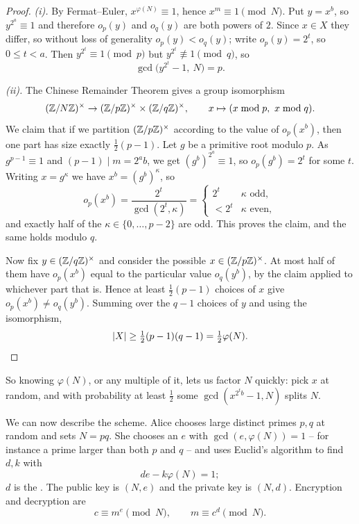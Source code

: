 \documentclass[a4paper]{scrartcl}
\begin{document}
\begin{proof}
	\emph{(i).} By Fermat--Euler, $x^{\varphi(N)}\equiv1$, hence $x^m\equiv1\pmod N$. Put $y = x^b$, so $y^{2^a}\equiv1$ and therefore $o_p(y)$ and $o_q(y)$ are both powers of $2$. Since $x \in X$ they differ, so without loss of generality $o_p(y)<o_q(y)$; write $o_p(y)=2^t$, so $0 \le t<a$. Then $y^{2^t}\equiv1\pmod p$ but $y^{2^t}\not\equiv1\pmod q$, so
	$$\gcd\bigl(y^{2^t}-1,\ N\bigr) = p.$$

	\emph{(ii).} The Chinese Remainder Theorem gives a group isomorphism
	$$(\Z/N\Z)^\times \to (\Z/p\Z)^\times\times(\Z/q\Z)^\times, \qquad x \mapsto (x \bmod p,\ x\bmod q).$$
	We claim that if we partition $(\mathbb{Z}/p\mathbb{Z})^\times$ according to the value of $o_p(x^b)$, then one part has size exactly $\tfrac12(p-1)$. Let $g$ be a primitive root modulo $p$. As $g^{p-1}\equiv1$ and $(p-1)\mid m = 2^ab$, we get $(g^b)^{2^a}\equiv1$, so $o_p(g^b) = 2^t$ for some $t$. Writing $x = g^\kappa$ we have $x^b = (g^b)^\kappa$, so
	$$o_p(x^b) = \frac{2^t}{\gcd(2^t,\kappa)} = \begin{cases} 2^t & \kappa \text{ odd},\\ <2^t & \kappa \text{ even},\end{cases}$$
	and exactly half of the $\kappa \in\{0,\dots,p-2\}$ are odd. This proves the claim, and the same holds modulo $q$.

	Now fix $y \in (\mathbb{Z}/q\mathbb{Z})^\times$ and consider the possible $x \in (\mathbb{Z}/p\mathbb{Z})^\times$. At most half of them have $o_p(x^b)$ equal to the particular value $o_q(y^b)$, by the claim applied to whichever part that is. Hence at least $\tfrac12(p-1)$ choices of $x$ give $o_p(x^b)\ne o_q(y^b)$. Summing over the $q-1$ choices of $y$ and using the isomorphism,
	$$\lvert X\rvert\ge\tfrac12(p-1)(q-1) = \tfrac12\varphi(N). \qedhere$$
\end{proof}

So knowing $\varphi(N)$, or any multiple of it, lets us factor $N$ quickly: pick $x$ at random, and with probability at least $\tfrac12$ some $\gcd(x^{2^tb}-1,N)$ splits $N$.

We can now describe the scheme. Alice chooses large distinct primes $p,q$ at random and sets $N = pq$. She chooses an  $e$ with $\gcd(e,\varphi(N))=1$ -- for instance a prime larger than both $p$ and $q$ -- and uses Euclid's algorithm to find $d,k$ with
$$de - k\varphi(N) = 1;$$
$d$ is the . The public key is $(N,e)$ and the private key is $(N,d)$. Encryption and decryption are
$$c \equiv m^e \pmod N, \qquad m \equiv c^d\pmod N.$$
\end{document}
